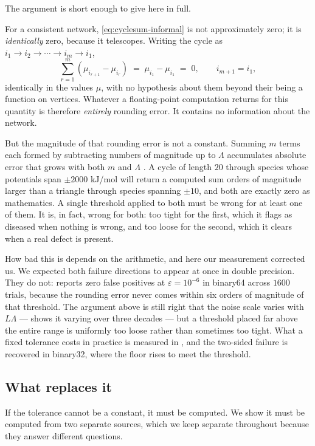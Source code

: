 \documentclass[11pt,twocolumn,a4paper]{article}
\theoremstyle{pstyle}
\theoremstyle{definition}
\theoremstyle{remark}
\newcommand{\eps}{\varepsilon}
\begin{document}
The argument is short enough to give here in full.

For a consistent network, \eqref{eq:cyclesum-informal} is not
approximately zero; it is \emph{identically} zero, because it
telescopes. Writing the cycle as $i_1 \to i_2 \to \cdots \to i_m \to
i_1$,
\[
  \sum_{r=1}^{m} (\mu_{i_{r+1}} - \mu_{i_r}) \;=\; \mu_{i_1}-\mu_{i_1}
  \;=\; 0, \qquad i_{m+1}=i_1,
\]
identically in the values $\mu$, with no hypothesis about them beyond
their being a function on vertices. Whatever a floating-point
computation returns for this quantity is therefore \emph{entirely}
rounding error. It contains no information about the network.

But the magnitude of that rounding error is not a constant. Summing $m$
terms each formed by subtracting numbers of magnitude up to $\Lambda$
accumulates absolute error that grows with both $m$ and $\Lambda$
\citep{higham2002,goldberg1991}. A cycle of length $20$ through species
whose potentials span $\pm 2000$ kJ/mol will return a computed sum
orders of magnitude larger than a triangle through species spanning
$\pm 10$, and both are exactly zero as mathematics. A single threshold
applied to both must be wrong for at least one of them. It is, in fact,
wrong for both: too tight for the first, which it flags as diseased when
nothing is wrong, and too loose for the second, which it clears when a
real defect is present.

How bad this is depends on the arithmetic, and here our
measurement corrected us. We expected both failure directions to appear
at once in double precision. They do not:
 reports zero false positives at
$\eps=10^{-6}$ in binary64 across $1600$ trials, because the rounding
error never comes within six orders of magnitude of that threshold. The
argument above is still right that the noise scale varies with
$L\Lambda$ ---  shows it varying over three decades --- but
a threshold placed far above the entire range is uniformly too loose
rather than sometimes too tight. What a fixed tolerance costs in
practice is measured in , and the
two-sided failure is recovered in binary32, where the floor rises to
meet the threshold.

\subsection{What replaces it}

If the tolerance cannot be a constant, it must be computed. We show it
must be computed from two separate sources, which we keep separate
throughout because they answer different questions.
\end{document}
